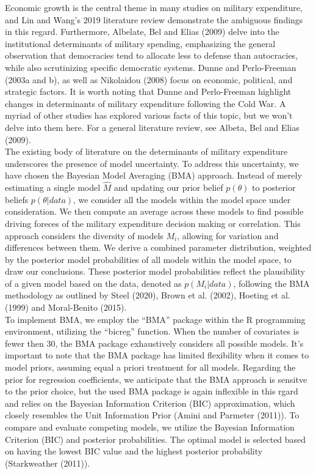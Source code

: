\documentclass[12pt,a4paper]{article}
\begin{document}
Economic growth is the central theme in many studies on military expenditure, and Lin and Wang’s 2019 literature review demonstrate the ambiguous findings in this regard. Furthermore, Albelate, Bel and Elias (2009) delve into the institutional determinants of military spending, emphasizing the general observation that democracies tend to allocate less to defense than autocracies, while also scrutinizing specific democratic systems. Dunne and Perlo-Freeman (2003a and b), as well as Nikolaidou (2008) focus on economic, political, and strategic factors. It is worth noting that Dunne and Perlo-Freeman highlight changes in determinants of military expenditure following the Cold War. A myriad of other studies has explored various facts of this topic, but we won’t delve into them here. For a general literature review, see Albeta, Bel and Elias (2009). \\

The existing body of literature on the determinants of military expenditure underscores the presence of model uncertainty. To address this uncertainty, we have chosen the Bayesian Model Averaging (BMA) approach. Instead of merely estimating a single model $\hat{M}$ and updating our prior belief $p(\theta)$ to posterior beliefs $p(\theta \vert data)$, we consider all the models within the model space under consideration. We then compute an average across these models to find possible driving foreces of the military expenditure decision making or correlation. This approach considers the diversity of models $M_{i}$, allowing for variation and differences between them. We derive a combined parameter distribution, weighted by the posterior model probabilities of all models within the model space, to draw our conclusions. These posterior model probabilities reflect the plausibility of a given model based on the data, denoted as $p(M_{i}\vert data)$, following the BMA methodology as outlined by Steel (2020), Brown et al. (2002),  Hoeting et al. (1999) and Moral-Benito (2015).\\

To implement BMA, we employ the “BMA” package within the R programming environment, utilizing the “bicreg” function. When the number of covariates is fewer then 30, the BMA package exhaustively considers all possible models. It’s important to note that the BMA package has limited flexibility when it comes to model priors, assuming equal a priori treatment for all models. Regarding the prior for regression coefficients, we anticipate that the BMA approach is sensitve to the prior choice, but the used BMA package is again inflexible in this rgard and relies on the Bayesian Information Criterion (BIC) approximation, which closely resembles the Unit Information Prior (Amini and Parmeter (2011)). To compare and evaluate competing models, we utilize the Bayesian Information Criterion (BIC) and posterior probabilities. The optimal model is selected based on having the lowest BIC value and the highest posterior probability (Starkweather (2011)).
\end{document}
